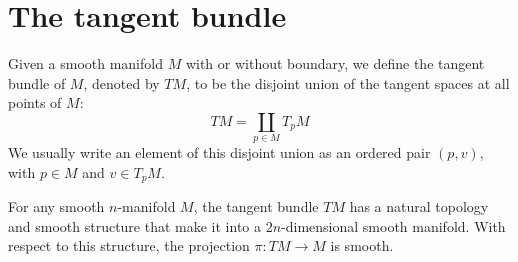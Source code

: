 \section{The tangent bundle}
Given a smooth manifold $M$ with or without boundary, we define the tangent bundle of $M$, denoted by $TM$, to be the disjoint union of the tangent spaces at all points of $M$:
\[TM=\coprod_{p\in M}T_pM\]
We usually write an element of this disjoint union as an ordered pair $(p,v)$, with $p\in M$ and $v\in T_pM$.
\begin{proposition}\label{tangent bundle struct}
For any smooth $n$-manifold $M$, the tangent bundle $TM$ has a natural topology and smooth structure that make it into a $2n$-dimensional smooth manifold. With respect to this structure, the projection $\pi:TM\to M$ is smooth.
\end{proposition}
